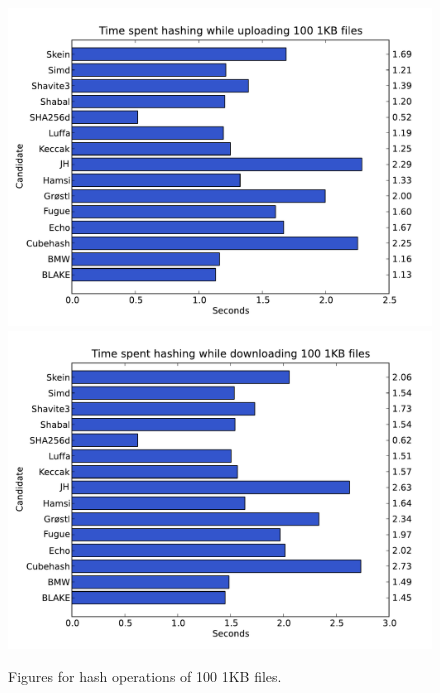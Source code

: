 \documentclass[english,12pt,a4paper]{book}
\begin{document}
\begin{figure}[h!]
    \centering
    \includegraphics[width=0.9\columnwidth]
        {graphs/Timespenthashingwhileuploading1001KBfiles.pdf}
    \includegraphics[width=0.9\columnwidth]
        {graphs/Timespenthashingwhiledownloading1001KBfiles.pdf}
    \caption{Figures for hash operations of 100 1KB files.}
    \label{fig:graph:1001kb}
\end{figure}
\end{document}
